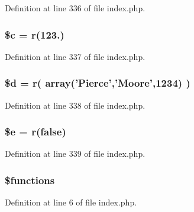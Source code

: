 Definition at line 336 of file index.\-php.

\hypertarget{namespace_pierce_moore_1_1_ruby_p_h_p_ab73d7f4f2dae233dd561e7fdaab3a77b}{
\subsubsection[{\$c}]{\setlength{\rightskip}{0pt plus 5cm}\$c = {\bf r}(123.)}}\label{namespace_pierce_moore_1_1_ruby_p_h_p_ab73d7f4f2dae233dd561e7fdaab3a77b}


Definition at line 337 of file index.\-php.

\hypertarget{namespace_pierce_moore_1_1_ruby_p_h_p_a0cf5dd496d9f5ff1edf00d234771dcfe}{
\subsubsection[{\$d}]{\setlength{\rightskip}{0pt plus 5cm}\$d = {\bf r}( array('Pierce','Moore',1234) )}}\label{namespace_pierce_moore_1_1_ruby_p_h_p_a0cf5dd496d9f5ff1edf00d234771dcfe}


Definition at line 338 of file index.\-php.

\hypertarget{namespace_pierce_moore_1_1_ruby_p_h_p_ab74076a9b7e1d23d12b9e8d65e60315a}{
\subsubsection[{\$e}]{\setlength{\rightskip}{0pt plus 5cm}\$e = {\bf r}(false)}}\label{namespace_pierce_moore_1_1_ruby_p_h_p_ab74076a9b7e1d23d12b9e8d65e60315a}


Definition at line 339 of file index.\-php.

\hypertarget{namespace_pierce_moore_1_1_ruby_p_h_p_aa75daea491817f3b64daa2f51128bcdf}{
\subsubsection[{\$functions}]{\setlength{\rightskip}{0pt plus 5cm}\$functions}}\label{namespace_pierce_moore_1_1_ruby_p_h_p_aa75daea491817f3b64daa2f51128bcdf}


Definition at line 6 of file index.\-php.

